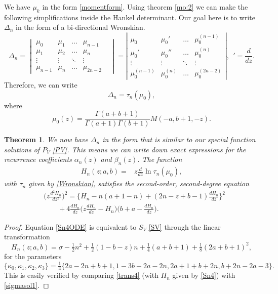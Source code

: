 \documentclass[12pt]{article}
\newtheorem{mydef}{Theorem}[section]
\numberwithin{figure}{section}
\numberwithin{equation}{section}
\numberwithin{table}{section}
\begin{document}
We have $\mu_k$ in the form \eqref{momentform}. Using theorem \eqref{mo:2} we can make the following simplifications inside the Hankel
determinant. Our goal here is to write $\Delta_n$ in the form of a bi-directional Wronskian.
\[\Delta_n=
\begin{vmatrix}
\mu_{0} & \mu_1  &\hdots& \mu_{n-1} \\
\mu_1 & \mu_2 &\hdots& \mu_n  \\
\vdots &\vdots & \ddots &\vdots & \\
\mu_{n-1} & \mu_n &\hdots& \mu_{2n-2}
\end{vmatrix}
=\left|
\begin{array}{ccccc}
\mu_{0} & \mu_{0}'  &\hdots&  \mu_{0}^{(n-1)} \\
\mu_{0}' & \mu_{0}''  &\hdots&  \mu_{0}^{(n)}  \\
\vdots &\vdots  & \ddots &\vdots \\
\mu_{0}^{(n-1)} & \mu_{0}^{(n)}  &\hdots& \mu_{0}^{(2n-2)}
\end{array}
\right|,~~'=\frac{d}{dz}.\]
Therefore, we can write
\begin{equation}
\Delta_n=\tau_n(\mu_{0}),\label{taudelta4}
\end{equation}
where
\begin{equation}\nonumber
\mu_0(z)=\frac{\Gamma( a+ b+1)}{\Gamma( a+1)\Gamma( b+1)} M(- a, b+1,-z).
\end{equation}
\begin{mydef}
We now have $\Delta_n$ in the form that is similar to our special function solutions of $P_{V}$ \eqref{PV}. This means we can write down exact expressions for the recurrence coefficients $\alpha_n(z)$ and $\beta_n(z)$.
The function
\begin{align}
H_n(z; a, b)=&z\frac{d}{dz}\ln \tau_n(\mu_0),\label{Sn4}
\end{align}
with $\tau_n$ given by \eqref{Wronskian}, satisfies the second-order, second-degree equation
\begin{align}\nonumber
&\bigg(z\frac{d^2H_n}{dz^2}\bigg)^2=\bigg\{H_n-n(a+1-n)+(2n-z+b-1)\frac{dH_n}{dz}\bigg\}^2\\
&\qquad+4\frac{dH_n}{dz}\bigg(z\frac{dH_n}{dz}-H_n\bigg)\bigg(b+a-\frac{dH_n}{dz}\bigg).\label{Sn4ODE}
\end{align}
\end{mydef}
\begin{proof}
Equation \eqref{Sn4ODE} is equivalent to $S_V$ \eqref{SV} through the linear transformation
\begin{equation}
H_{{n}}(z; a, b)=\sigma-\tfrac{1}{2}n^2+\tfrac{1}{2}(1-b-z)n+\tfrac{1}{4}(a+b+1)+\tfrac{1}{8}(2a+b+1)^2,\label{trans4}
\end{equation}
for the parameters
\begin{equation}
\{\kappa_0,\kappa_1,\kappa_2,\kappa_3\}=\tfrac{1}{4}\{2 a-2n+ b+1,1-3 b-2 a-2n,2 a+1+ b+2n,b+
2n-2 a-3\}.\label{para4}
\end{equation}
This is easily verified by comparing \eqref{trans4} (with $H_n$ given by \eqref{Sn4}) with \eqref{sigmasol1}.
\end{proof}
\end{document}
